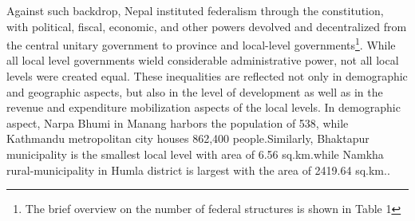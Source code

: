 Against such backdrop, Nepal instituted federalism through the constitution, with political, fiscal, economic, and other powers devolved and decentralized from the central unitary government to province and local-level governments\footnote{The brief overview on the number of federal structures is shown in Table 1}. While all local level governments wield considerable administrative power, not all local levels were created equal. These inequalities are reflected not only in demographic and geographic aspects, but also in the level of development as well as in the revenue and expenditure mobilization aspects of the local levels. In demographic aspect, Narpa Bhumi in Manang harbors the population of 538, while Kathmandu metropolitan city houses 862,400 people.\hspace{1mm}Similarly, Bhaktapur municipality is the smallest local level with area of 6.56 sq.km.\hspace{1mm}while Namkha rural-municipality in Humla district is largest with the area of 2419.64 sq.km.. \par

